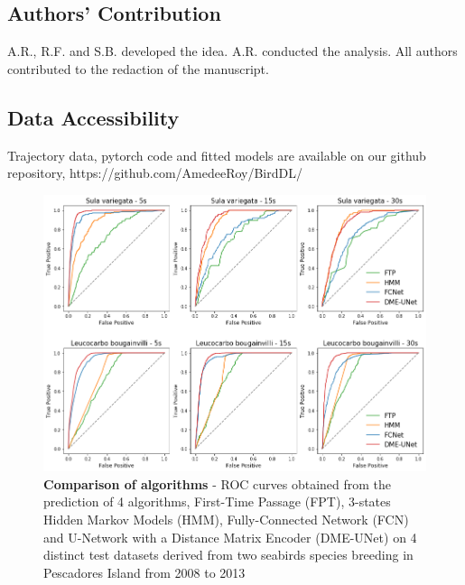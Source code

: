 \documentclass{article}
\begin{document}
\subsection*{Authors' Contribution}
A.R., R.F. and S.B. developed the idea. A.R. conducted the analysis. All authors contributed to the redaction of the manuscript.

\subsection*{Data Accessibility}
Trajectory data, pytorch code and fitted models are available on our github repository, https://github.com/AmedeeRoy/BirdDL/




\newpage

\begin{figure}[h]
  \centering
  \includegraphics[scale=0.5]{figure1.png}
  \caption{\textbf{Comparison of algorithms} - ROC curves obtained from the prediction of 4 algorithms, First-Time Passage (FPT), 3-states Hidden Markov Models (HMM), Fully-Connected Network (FCN) and U-Network with a Distance Matrix Encoder (DME-UNet) on 4 distinct test datasets derived from two seabirds species breeding in Pescadores Island from 2008 to 2013}
  \label{figure1}
\end{figure}
\end{document}
